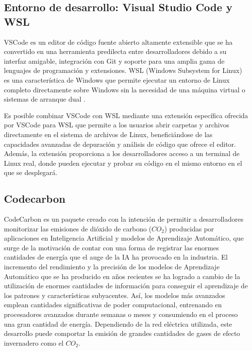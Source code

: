 \subsection{Entorno de desarrollo: Visual Studio Code y WSL}
\label{sec:dev-env}

VSCode es un editor de código fuente abierto altamente extensible que se ha convertido en una herramienta predilecta entre desarrolladores debido a su interfaz amigable, integración con Git y soporte para una amplia gama de lenguajes de programación y extensiones. WSL (Windows Subsystem for Linux) es una característica de Windows que permite ejecutar un entorno de Linux completo directamente sobre Windows sin la necesidad de una máquina virtual o sistemas de arranque dual \cite{barnes2021pro}.

Es posible combinar VSCode con WSL mediante una extensión específica ofrecida por VSCode para WSL que permite a los usuarios abrir carpetas y archivos directamente en el sistema de archivos de Linux, beneficiándose de las capacidades avanzadas de depuración y análisis de código que ofrece el editor. Además, la extensión proporciona a los desarrolladores acceso a un terminal de Linux real, donde pueden ejecutar y probar su código en el mismo entorno en el que se desplegará. 


\subsection{Codecarbon}

CodeCarbon \cite{codecarbon}\cite{codecarbon-software} es un paquete creado con la intención de permitir a desarrolladores monitorizar las emisiones de dióxido de carbono ($CO_{2}$) producidas por aplicaciones en Inteligencia Artificial y modelos de Aprendizaje Automático, que surge de la motivación de contar con una forma de registrar las enormes cantidades de energía que el auge de la IA ha provocado en la industria. El incremento del rendimiento y la precisión de los modelos de Aprendizaje Automático que se ha producido en años recientes se ha logrado a cambio de la utilización de enormes cantidades de información para conseguir el aprendizaje de los patrones y características subyacentes. Así, los modelos más avanzados emplean cantidades significativas de poder computacional, entrenando en procesadores avanzados durante semanas o meses y consumiendo en el proceso una gran cantidad de energía. Dependiendo de la red eléctrica utilizada, este desarrollo puede comportar la emisión de grandes cantidades de gases de efecto invernadero como el $CO_{2}$.

